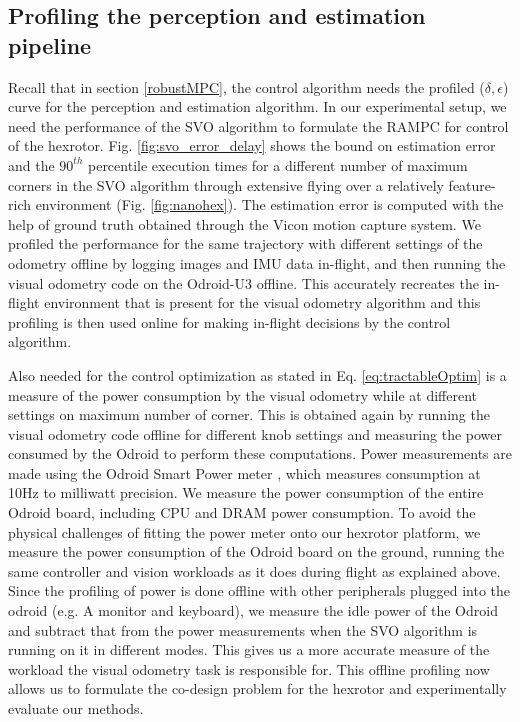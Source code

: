 

\subsection{Profiling the perception and estimation pipeline}

Recall that in section \ref{robustMPC}, the control algorithm needs the profiled ($\delta,\epsilon$) curve for the perception and estimation algorithm. In our experimental setup, we need the performance of the SVO algorithm to formulate the RAMPC for control of the hexrotor. Fig. \ref{fig:svo_error_delay} shows the bound on estimation error and the $90^{th}$ percentile execution times for a different number of maximum corners in the SVO algorithm through extensive flying over a relatively feature-rich environment (Fig. \ref{fig:nanohex}). The estimation error is computed with the help of ground truth obtained through the Vicon motion capture system. We profiled the performance for the same trajectory with different settings of the odometry offline by logging images and IMU data in-flight, and then running the visual odometry code on the Odroid-U3 offline.
This accurately recreates the in-flight environment that is present for the visual odometry algorithm and this profiling is then used online for making in-flight decisions by the control algorithm.

Also needed for the control optimization as stated in Eq. \ref{eq:tractableOptim} is a measure of the power consumption by the visual odometry while at different settings on maximum number of corner. This is obtained again by running the visual odometry code offline for different knob settings and measuring the power consumed by the Odroid to perform these computations. Power measurements are made using the Odroid Smart Power meter \cite{OdroidSmartPower}, which measures consumption at 10Hz to milliwatt precision. We measure the power consumption of the entire Odroid board, including CPU and DRAM power consumption. To avoid the physical challenges of fitting the power meter onto our hexrotor platform, we measure the power consumption of the Odroid board on the ground, running the same controller and vision workloads as it does during flight as explained above. Since the profiling of power is done offline with other peripherals plugged into the odroid (e.g. A monitor and keyboard), we measure the idle power of the Odroid and subtract that from the power measurements when the SVO algorithm is running on it in different modes. This gives us a more accurate measure of the workload the visual odometry task is responsible for. This offline profiling now allows us to formulate the co-design problem for the hexrotor and experimentally evaluate our methods.


